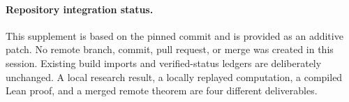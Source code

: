 \paragraph{Repository integration status.}
This supplement is based on the pinned commit and is provided as an additive
patch. No remote branch, commit, pull request, or merge was created in this
session. Existing build imports and verified-status ledgers are deliberately
unchanged. A local research result, a locally replayed computation, a compiled
Lean proof, and a merged remote theorem are four different deliverables.



\endgroup
